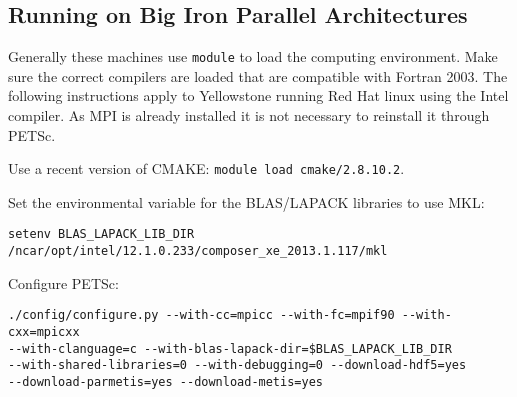 \subsection{Running on Big Iron Parallel Architectures}

Generally these machines use {\footnotesize\tt module} to load the computing environment.
Make sure the correct compilers are loaded that are compatible with Fortran 2003. The following instructions apply to Yellowstone running Red Hat linux using the Intel compiler. As MPI is already installed it is not necessary to reinstall it through PETSc.

\noindent
Use a recent version of CMAKE: {\footnotesize\tt module load cmake/2.8.10.2}.

\noindent Set the environmental variable for the BLAS/LAPACK libraries to use MKL:

\noindent
{\footnotesize\tt setenv BLAS\_LAPACK\_LIB\_DIR /ncar/opt/intel/12.1.0.233/composer\_xe\_2013.1.117/mkl}

\noindent
Configure PETSc:
\footnotesize
\begin{Verbatim}
./config/configure.py --with-cc=mpicc --with-fc=mpif90 --with-cxx=mpicxx 
--with-clanguage=c --with-blas-lapack-dir=$BLAS_LAPACK_LIB_DIR 
--with-shared-libraries=0 --with-debugging=0 --download-hdf5=yes 
--download-parmetis=yes --download-metis=yes
\end{Verbatim}
\normalsize


